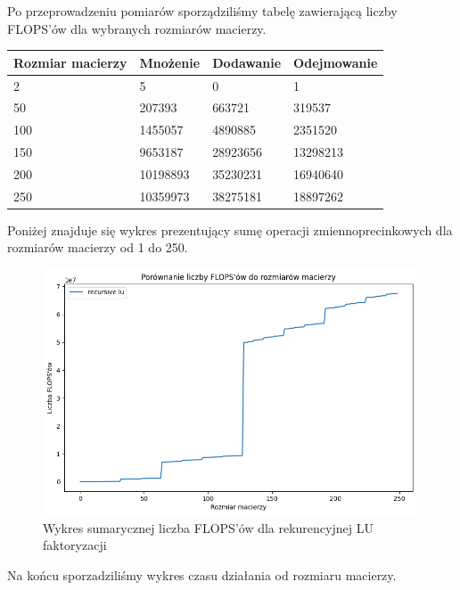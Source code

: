 \documentclass{article}
\begin{document}
Po przeprowadzeniu pomiarów sporządziliśmy tabelę zawierającą liczby FLOPS'ów dla wybranych rozmiarów macierzy.

\begin{table}[!ht]
    \centering
    \begin{tabular}{|l|l|l|l|}
    \hline
        Rozmiar macierzy & Mnożenie & Dodawanie & Odejmowanie \\ \hline
        2 & 5 & 0 & 1 \\ \hline
        50 & 207393 & 663721 & 319537 \\ \hline
        100 & 1455057 & 4890885 & 2351520 \\ \hline
        150 & 9653187 & 28923656 & 13298213 \\ \hline
        200 & 10198893 & 35230231 & 16940640 \\ \hline
        250 & 10359973 & 38275181 & 18897262 \\ \hline
    \end{tabular}
\end{table}

\noindent
Poniżej znajduje się wykres prezentujący sumę operacji zmiennoprecinkowych
dla rozmiarów macierzy od 1 do 250.

\begin{figure}[H]
  \centering
    \includegraphics[width=0.99\textwidth]{lu_flops.png}
  \caption{Wykres sumarycznej liczba FLOPS'ów dla rekurencyjnej LU faktoryzacji}
\end{figure}

\noindent
Na końcu sporzadziliśmy wykres czasu działania od rozmiaru macierzy.
\end{document}
